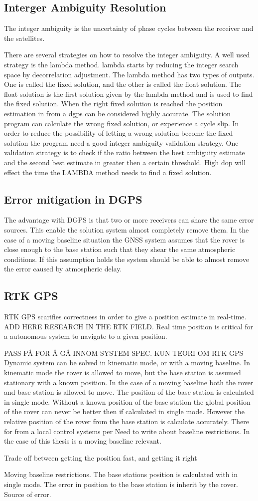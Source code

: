 \subsection{Interger Ambiguity Resolution}
The integer ambiguity is the uncertainty of phase cycles between the receiver and the satellites.

There are several strategies on how to resolve the integer ambiguity. A well used strategy is the \gls{lambda} method. \gls{lambda} starts by reducing the integer search space by decorrelation adjustment. The \gls{lambda} method has two types of outputs. One is called the fixed solution, and the other is called the float solution. The float solution is the first solution given by the \gls{lambda} method and is used to find the fixed solution. When the right fixed solution is reached the position estimation in from a \gls{dgps} can be considered highly accurate. The solution program can calculate the wrong fixed solution, or experience a cycle slip. In order to reduce the possibility of letting a wrong solution become the fixed solution the program need a good integer ambiguity validation strategy. One validation strategy is to check if the ratio between the best ambiguity estimate and the second best estimate in greater then a certain threshold. High \gls{dop} will effect the time the LAMBDA method needs to find a fixed solution.
\subsection{Error mitigation in DGPS} \label{ss: Error mitigation DGPS}
The advantage with DGPS is that two or more receivers can share the same error sources. This enable the solution system almost completely remove them.
In the case of a moving baseline situation the GNSS system assumes that the rover is close enough to the base station such that they shear the same atmospheric conditions. If this assumption holds the system should be able to almost remove the error caused by atmospheric delay.


\subsection{RTK GPS}\label{ss:rtk-gps}
RTK GPS scarifies correctness in order to give a position estimate in real-time. ADD HERE RESEARCH IN THE RTK FIELD. Real time position is critical for a autonomous system to navigate to a given position. 


PASS PÅ FOR Å GÅ INNOM SYSTEM SPEC. KUN TEORI OM RTK GPS
Dynamic system can be solved in kinematic mode, or with a moving baseline. In kinematic mode the rover is allowed to move, but the base station is assumed stationary with a known position. In the case of a moving baseline both the rover and base station is allowed to move. The position of the base station is calculated in single mode. Without a known position of the base station the global position of the rover can never be better then if calculated in single mode. However the relative position of the rover from the base station is calculate accurately. There for from a local control systems per
Need to write about baseline restrictions. In the case of this thesis is a moving baseline relevant.

Trade off between getting the position fast, and getting it right 

Moving baseline restrictions. The base stations position is calculated with in single mode. The error in position to the base station is inherit by the rover. Source of error.

\cleardoublepage